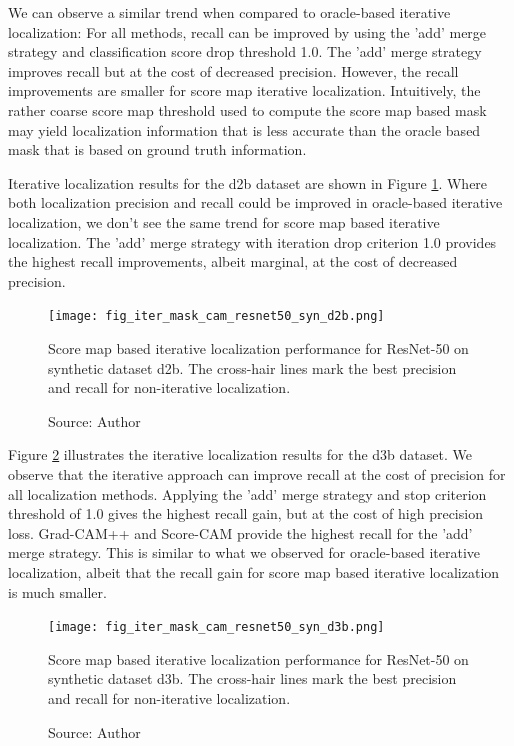 We can observe a similar trend when compared to oracle-based iterative localization: For all methods, recall can be improved by using the 'add' merge strategy and classification score drop threshold 1.0. The 'add' merge strategy improves recall but at the cost of decreased precision. However, the recall improvements are smaller for score map iterative localization. Intuitively, the rather coarse score map threshold used to compute the score map based mask may yield localization information that is less accurate than the oracle based mask that is based on ground truth information.

Iterative localization results for the d2b dataset are shown in Figure \ref{fig:prec_iter_mask_cam_resnet50_syn_d2b}. Where both localization precision and recall could be improved in oracle-based iterative localization, we don't see the same trend for score map based iterative localization. The 'add' merge strategy with iteration drop criterion 1.0 provides the highest recall improvements, albeit marginal, at the cost of decreased precision.

\begin{figure}[h]
    \begin{center}       
    \texttt{[image: fig\_iter\_mask\_cam\_resnet50\_syn\_d2b.png]}
    \caption[Score map based iterative localization performance for ResNet-50 on synthetic dataset d2b]{Score map based iterative localization performance for ResNet-50 on synthetic dataset d2b. The cross-hair lines mark the best precision and recall for non-iterative localization.}
    \caption*{Source: Author}
    \label{fig:prec_iter_mask_cam_resnet50_syn_d2b}
    \end{center}
\end{figure}

Figure \ref{fig:prec_iter_mask_cam_resnet50_syn_d3b} illustrates the iterative localization results for the d3b dataset. We observe that the iterative approach can improve recall at the cost of precision for all localization methods. Applying the 'add' merge strategy and stop criterion threshold of 1.0 gives the highest recall gain, but at the cost of high precision loss. Grad-CAM++ and Score-CAM provide the highest recall for the 'add' merge strategy. This is similar to what we observed for oracle-based iterative localization, albeit that the recall gain for score map based iterative localization is much smaller.

\begin{figure}[h]
    \begin{center}       
    \texttt{[image: fig\_iter\_mask\_cam\_resnet50\_syn\_d3b.png]}
    \caption[Score map based iterative localization performance for ResNet-50 on synthetic dataset d3b]{Score map based iterative localization performance for ResNet-50 on synthetic dataset d3b. The cross-hair lines mark the best precision and recall for non-iterative localization.}
    \caption*{Source: Author}
    \label{fig:prec_iter_mask_cam_resnet50_syn_d3b}
    \end{center}
\end{figure}

